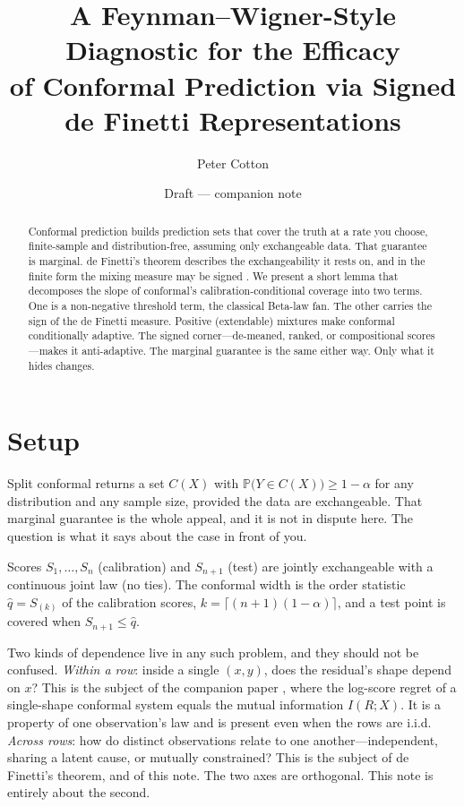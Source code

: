 \documentclass[11pt]{article}
\title{A Feynman--Wigner-Style Diagnostic for the Efficacy\\
of Conformal Prediction via Signed de Finetti Representations}
\author{Peter Cotton}
\date{Draft --- companion note}
\begin{document}
\maketitle

\begin{abstract}
Conformal prediction builds prediction sets that cover the truth at a rate you choose,
finite-sample and distribution-free, assuming only exchangeable data. That
guarantee is marginal. de Finetti's theorem describes the exchangeability it rests on, and in
the finite form the mixing measure may be signed \citep{kerns2006}. We present a short lemma that decomposes the
slope of conformal's calibration-conditional coverage into two terms. One is a non-negative
threshold term, the classical Beta-law fan. The other carries the sign of the de Finetti
measure. Positive (extendable) mixtures make conformal conditionally adaptive. The signed
corner---de-meaned, ranked, or compositional scores---makes it anti-adaptive. The marginal
guarantee is the same either way. Only what it hides changes.
\end{abstract}

\section{Setup}

Split conformal returns a set $C(X)$ with $\mathbb P\big(Y\in C(X)\big)\ge 1-\alpha$ for any
distribution and any sample size, provided the data are exchangeable. That marginal guarantee
is the whole appeal, and it is not in dispute here. The question is what it says about the case
in front of you.

Scores $S_1,\dots,S_n$ (calibration) and $S_{n+1}$ (test) are jointly
exchangeable with a continuous joint law (no ties). The conformal width is the order
statistic $\hat q = S_{(k)}$ of the calibration scores, $k=\lceil(n+1)(1-\alpha)\rceil$, and a
test point is covered when $S_{n+1}\le\hat q$.

Two kinds of dependence live in any such problem, and they should not be confused.
\emph{Within a row}: inside a single $(x,y)$, does the residual's shape depend on $x$? This is
the subject of the companion paper \citep{cotton_marginally}, where the log-score regret of a
single-shape conformal system equals the mutual information $I(R;X)$. It is a property of one
observation's law and is present even when the rows are i.i.d. \emph{Across rows}: how do
distinct observations relate to one another---independent, sharing a latent cause, or mutually
constrained? This is the subject of de Finetti's theorem, and of this note. The two axes are
orthogonal. This note is entirely about the second.
\end{document}
